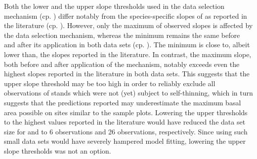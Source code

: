 Both the lower and the upper slope thresholds used in the data selection mechanism (cp. ) differ notably from the species-specific slopes of  as reported in the literature (cp. ).  However, only the maximum of observed slopes is affected by the data selection mechanism, whereas the minimum remains the same before and after its application in both data sets (cp. ).  The minimum is close to, albeit lower than, the slopes reported in the literature.  In contrast, the maximum slope, both before and after application of the mechanism, notably exceeds even the highest slopes reported in the literature in both data sets.   This suggests that the upper slope threshold may be too high in order to reliably exclude all observations of stands which were not (yet) subject to self-thinning, which in turn suggests that the predictions reported may underestimate the maximum basal area possible on sites similar to the sample plots.  Lowering the upper thresholds to the highest values reported in the literature would have reduced the data set size for \Beech{} and \Spruce{} to \num{6} observations and \num{26} observations, respectively.  Since using such small data sets would have severely hampered model fitting, lowering the upper slope thresholds was not an option.

